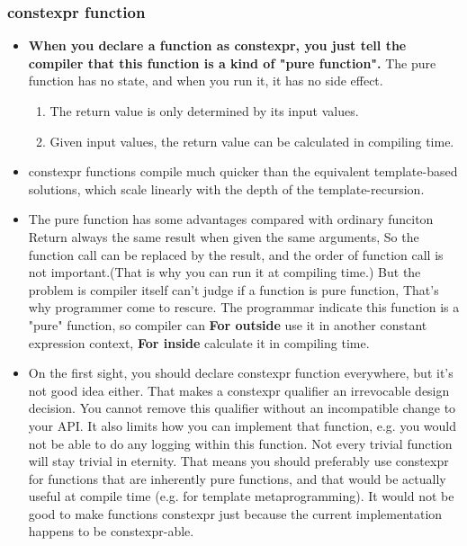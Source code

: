 \documentclass[a4paper,11pt,twoside]{book}
\begin{document}
\subsubsection{constexpr function}
\begin{itemize}
	\item \textbf{When you declare a function as constexpr, you just tell the compiler that this function is a kind of "pure function".} The pure function has no state, and when you run it, it has no side effect.
	\begin{enumerate}
		\item The return value is only determined by its input values.
		\item Given input values, the return value can be calculated in compiling time. 
	\end{enumerate}

	\item constexpr functions compile much quicker than the equivalent template-based solutions, which scale linearly with the depth of the template-recursion.
	
	\item The pure function has some advantages compared with ordinary funciton Return always the same result when given the same arguments, So the function call can be replaced by the result, and the order of function call is not important.(That is why you can run it at compiling time.) But the problem is compiler itself can't judge if a function is pure function, That's why programmer come to rescure. The programmar indicate this function is a "pure" function, so compiler can \textbf{For outside} use it in another constant expression context, \textbf{For inside} calculate it in compiling time. 
	
	\item On the first sight, you should declare constexpr function everywhere, but it's not good idea either. That makes a constexpr qualifier an irrevocable design decision. You cannot remove this qualifier without an incompatible change to your API. It also limits how you can implement that function, e.g. you would not be able to do any logging within this function. Not every trivial function will stay trivial in eternity. That means you should preferably use constexpr for functions that are inherently pure functions, and that would be actually useful at compile time (e.g. for template metaprogramming). It would not be good to make functions constexpr just because the current implementation happens to be constexpr-able.
	

\end{itemize}
\end{document}
